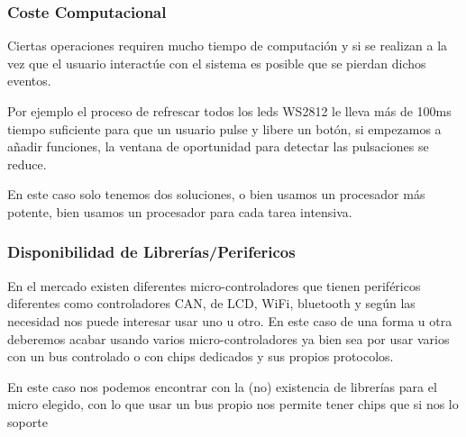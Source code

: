 \subsubsection{Coste Computacional}
Ciertas operaciones requiren mucho tiempo de computación y si se realizan a la vez que el usuario interactúe con
el sistema es posible que se pierdan dichos eventos.

Por ejemplo el proceso de refrescar todos los leds WS2812 le lleva más de 100ms tiempo suficiente para que un
usuario pulse y libere un botón, si empezamos a añadir funciones, la ventana de oportunidad para detectar las
pulsaciones se reduce.

En este caso solo tenemos dos soluciones, o bien usamos un procesador más potente, bien usamos un procesador
para cada tarea intensiva.

\subsubsection{Disponibilidad de Librerías/Perifericos}
En el mercado existen diferentes micro-controladores que tienen periféricos diferentes como controladores CAN, %
de LCD, WiFi, bluetooth y según las necesidad nos puede interesar usar uno u otro. En este caso de una forma u
otra deberemos acabar usando varios micro-controladores ya bien sea por usar varios con un bus controlado o con %
chips dedicados y sus propios protocolos.

En este caso nos podemos encontrar con la (no) existencia de librerías para el micro elegido, con lo que usar
un bus propio nos permite tener chips que si nos lo soporte
